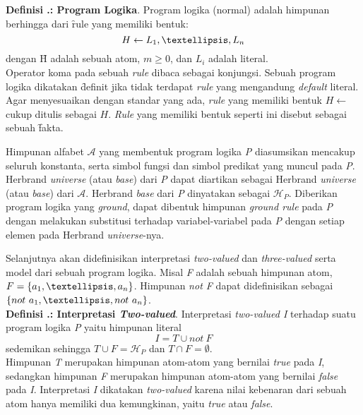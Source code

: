 \noindent\textbf{Definisi \thebabDuaNum.\thedefBabDua: Program Logika}. Program logika (normal) adalah himpunan berhingga dari \f{rule} yang memiliki bentuk:
\begin{displaymath}
	H \leftarrow L_1,\textellipsis,L_n
\end{displaymath}
dengan \f{H} adalah sebuah atom, $m \geq 0$, dan $L_i$ adalah literal.
\\

Operator koma pada sebuah \textit{rule} dibaca sebagai konjungsi. Sebuah program logika dikatakan \f{definit}  jika tidak terdapat \textit{rule} yang mengandung \textit{default} literal. Agar menyesuaikan dengan standar yang ada, \textit{rule} yang memiliki bentuk $H \leftarrow $ cukup ditulis sebagai $H$. \textit{Rule} yang memiliki bentuk seperti ini disebut sebagai sebuah \f{fakta}.

Himpunan alfabet $\mathcal{A}$ yang membentuk program logika \textit{P} diasumsikan mencakup seluruh konstanta, serta simbol fungsi dan simbol predikat yang muncul pada \textit{P}. Herbrand \textit{universe} (atau \textit{base}) dari \textit{P} dapat diartikan sebagai Herbrand \textit{universe} (atau \textit{base}) dari $\mathcal{A}$. Herbrand \textit{base} dari \textit{P} dinyatakan sebagai $\mathcal{H}_P$. Diberikan program logika yang \textit{ground}, dapat dibentuk himpunan \textit{ground rule} pada \textit{P} dengan melakukan substitusi terhadap variabel-variabel pada \textit{P} dengan setiap elemen pada Herbrand \textit{universe}-nya.

Selanjutnya akan didefinisikan interpretasi \textit{two-valued} dan \textit{three-valued} serta model dari sebuah program logika. Misal \textit{F} adalah sebuah himpunan atom, $F = \{a_1,\textellipsis,a_n\}$. Himpunan \textit{not F} dapat didefinisikan sebagai $\{not \ a_1,\textellipsis,not \ a_n\}$.
\\

\noindent \textbf{Definisi \thebabDuaNum.\thedefBabDua: Interpretasi \textit{Two-valued}}. Interpretasi \textit{two-valued I} terhadap suatu program logika \textit{P} yaitu himpunan literal
\begin{displaymath}
I = T \cup not \ F
\end{displaymath}
sedemikan sehingga $T \cup F = \mathcal{H}_P$ dan $T \cap F = \emptyset$.
\\

\noindent Himpunan \textit{T} merupakan himpunan atom-atom yang bernilai \textit{true} pada \textit{I}, sedangkan himpunan \textit{F} merupakan himpunan atom-atom yang bernilai \textit{false} pada \textit{I}. Interpretasi \textit{I} dikatakan \textit{two-valued} karena nilai kebenaran dari sebuah atom hanya memiliki dua kemungkinan, yaitu \textit{true} atau \textit{false}. 

